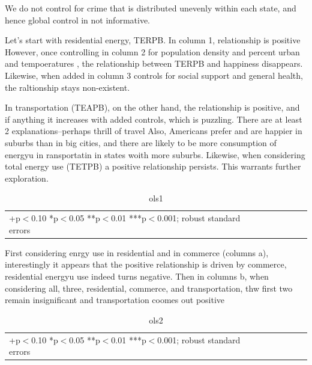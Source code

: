 \documentclass[10pt, letterpaper]{article}
\begin{document}
\begin{spacing}{1.4}
We do not control for crime that is distributed unevenly within each state, and
hence global control in not informative.  

Let's start with residential energy, TERPB.
In column 1, relationship is positive  However, once controlling in column 2 for
population density and percent urban and tempoeratures , the relationship
between TERPB and happiness disappears. Likewise, when added in column 3
controls for social support and general health, the raltionship stays
non-existent. 


In transportation (TEAPB), on the other hand, the relationship is
positive, and if anything it increases with added controls, which is
puzzling. There are at least 2 explanations--perhaps thrill of travel %
Also, Americans prefer \cite{fuguitt90,fuguitt75} and are happier
\cite{aok_hea_spr,aok11a} in suburbs than in big cities, and there are likely
to be more consumption of energyu  in ransportatin in states woith more suburbs.
Likewise, when considering total energy use (TETPB) a positive relationship
persists. This warrants further exploration. 

\begin{table}[H]\centering \caption{ols1} \label{ols1} \begin{scriptsize} \begin{tabular}{p{1.4in}p{.43in}p{.43in}p{.43in}p{.43in}p{.43in}p{.43in}p{.43in}p{.43in}p{.43in}p{.43 in}p{.43in}p{.43 in}}\hline  \hline\multicolumn{6}{l}{+p$<$0.10 *p$<$0.05 **p$<$0.01 ***p$<$0.001; robust standard errors} \end{tabular}\end{scriptsize}\end{table}


First considering enrgy use in residential and in commerce (columns a),
interestingly it appears that the positive relationship is driven by commerce,
residential energyu use indeed  turns negative. Then in columns b, when
considering all, three, residential, commerce, and transportation, thw first two
remain insignificant and transportation coomes out positive


\begin{table}[H]\centering \caption{ols2} \label{ols2} \begin{scriptsize} \begin{tabular}{p{1.4in}p{.43in}p{.43in}p{.43in}p{.43in}p{.43in}p{.43in}p{.43in}p{.43in}p{.43in}p{.43 in}p{.43in}p{.43 in}}\hline  \hline\multicolumn{6}{l}{+p$<$0.10 *p$<$0.05 **p$<$0.01 ***p$<$0.001; robust standard errors} \end{tabular}\end{scriptsize}\end{table}


\end{spacing}
\end{document}
